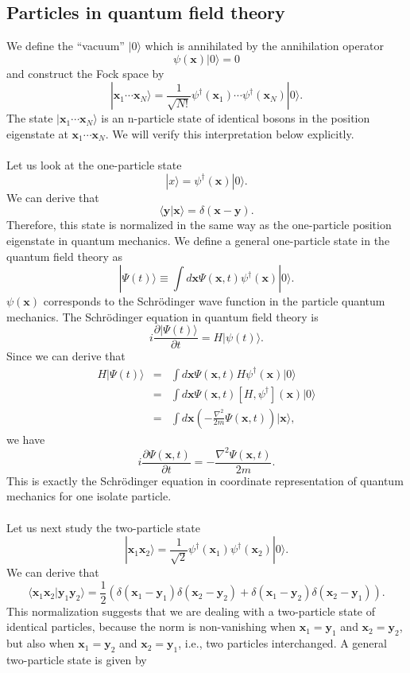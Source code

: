 \subsection{Particles in quantum field theory}
We define the ``vacuum'' $|0\rangle$ which is annihilated by the annihilation operator
\[\psi(\bm{x})|0\rangle = 0\]
and construct the Fock space by
\[|\bm{x}_1\cdots\bm{x}_N\rangle = \frac{1}{\sqrt{N!}}\psi^{\dagger}(\bm{x}_1)\cdots\psi^{\dagger}(\bm{x}_N)|0\rangle .\]
The state $|\bm{x}_1\cdots\bm{x}_N\rangle$ is an n-particle state of identical bosons in the position eigenstate
at $\bm{x}_1\cdots\bm{x}_N$. We will verify this interpretation below explicitly.
\\ \\
Let us look at the one-particle state
\[|x\rangle = \psi^{\dagger}(\bm{x})|0\rangle.\]
We can derive that
\[\langle \bm{y}| \bm{x}\rangle = \delta(\bm{x}-\bm{y}).\]
Therefore, this state is normalized in the same way as the one-particle position eigenstate in quantum mechanics.
We define a general one-particle state in the quantum field theory as
\[|\Psi(t)\rangle \equiv \int d\bm{x} \Psi(\bm{x},t)\psi^{\dagger}(\bm{x})|0\rangle.\]
$\psi(\bm{x})$ corresponds to the Schr\"{o}dinger wave function in the particle quantum mechanics. The Schr\"{o}dinger equation in quantum field theory is
\[i\frac{\partial |\Psi(t)\rangle}{\partial t} = H|\psi(t)\rangle.\]
Since we can derive that
\begin{eqnarray}
H|\Psi(t)\rangle &=& \int d\bm{x} \Psi(\bm{x},t) H\psi^{\dagger}(\bm{x})|0\rangle \nonumber \\
&=& \int d\bm{x} \Psi(\bm{x},t) [H,\psi^{\dagger}](\bm{x})|0\rangle \nonumber \\
&=& \int d\bm{x} \left( -\frac{\nabla^2}{2m}\Psi(\bm{x},t) \right)|\bm{x}\rangle, \nonumber
\end{eqnarray}
we have
\[i\frac{\partial \Psi(\bm{x},t)}{\partial t} = -\frac{\nabla^2\Psi(\bm{x},t)}{2m}.\]
This is exactly the Schr\"{o}dinger equation in coordinate representation of quantum mechanics for one isolate particle.\\ \\
Let us next study the two-particle state
\[|\bm{x}_1\bm{x}_2\rangle = \frac{1}{\sqrt{2}} \psi^{\dagger}(\bm{x}_1)\psi^{\dagger}(\bm{x}_2)|0\rangle.\]
We can derive that
\[\langle \bm{x}_1\bm{x}_2 |\bm{y}_1\bm{y}_2\rangle = \frac{1}{2} \left( \delta(\bm{x}_1-\bm{y}_1)\delta(\bm{x}_2-\bm{y}_2) + \delta(\bm{x}_1-\bm{y}_2)\delta(\bm{x}_2-\bm{y}_1)\right).\]
This normalization suggests that we are dealing with a two-particle state of identical particles, because the norm is non-vanishing when $\bm{x}_1 = \bm{y}_1$ and $\bm{x}_2 = \bm{y}_2$, but also when $\bm{x}_1 = \bm{y}_2$ and $\bm{x}_2 = \bm{y}_1$, i.e., two particles interchanged. A general two-particle state is given by

